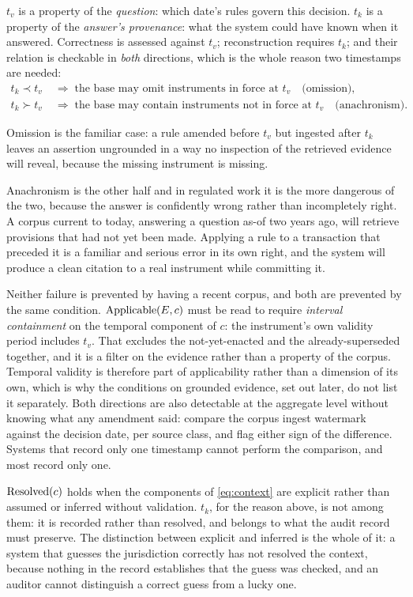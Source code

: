 $t_v$ is a property of the \emph{question}: which date's rules govern this decision.
$t_k$ is a property of the \emph{answer's provenance}: what the system could have
known when it answered. Correctness is assessed against $t_v$; reconstruction requires $t_k$; and their
relation is checkable in \emph{both} directions, which is the whole reason two
timestamps are needed:
\begin{align}
  t_k \prec t_v &\;\Longrightarrow\; \text{the base may omit instruments in force at }
    t_v \quad \text{(omission)}, \label{eq:bitemporal-stale}\\
  t_k \succ t_v &\;\Longrightarrow\; \text{the base may contain instruments not in
    force at } t_v \quad \text{(anachronism)}. \label{eq:bitemporal-anachronism}
\end{align}

Omission is the familiar case: a rule amended before $t_v$ but ingested after $t_k$
leaves an assertion ungrounded in a way no inspection of the retrieved evidence will
reveal, because the missing instrument is missing.

Anachronism is the other half and in regulated work it is the more dangerous of the two,
because the answer is confidently wrong rather than incompletely right. A corpus current
to today, answering a question as-of two years ago, will retrieve provisions that had
not yet been made. Applying a rule to a transaction that preceded it is a familiar and
serious error in its own right, and the system will produce a clean citation to a real
instrument while committing it.

Neither failure is prevented by having a recent corpus, and both are prevented by the
same condition. $\operatorname{Applicable}(E, c)$ must be read to require \emph{interval containment}
on the temporal component of $c$: the instrument's own validity period includes $t_v$.
That excludes the not-yet-enacted and the already-superseded together, and it is a
filter on the evidence rather than a property of the corpus. Temporal validity is
therefore part of applicability rather than a dimension of its own, which is why the
conditions on grounded evidence, set out later, do not list it separately. Both directions are also detectable at the aggregate level
without knowing what any amendment said: compare the corpus ingest watermark against
the decision date, per source class, and flag either sign of the difference. Systems that record only one timestamp cannot
perform the comparison, and most record only one.

$\operatorname{Resolved}(c)$ holds when the components of \eqref{eq:context} are explicit rather
than assumed or inferred without validation. $t_k$, for the reason above, is not
among them: it is recorded rather than resolved, and belongs to what the audit record
must preserve. The distinction between explicit and inferred is the whole of
it: a system that guesses the jurisdiction correctly has not resolved the context,
because nothing in the record establishes that the guess was checked, and an
auditor cannot distinguish a correct guess from a lucky one.

